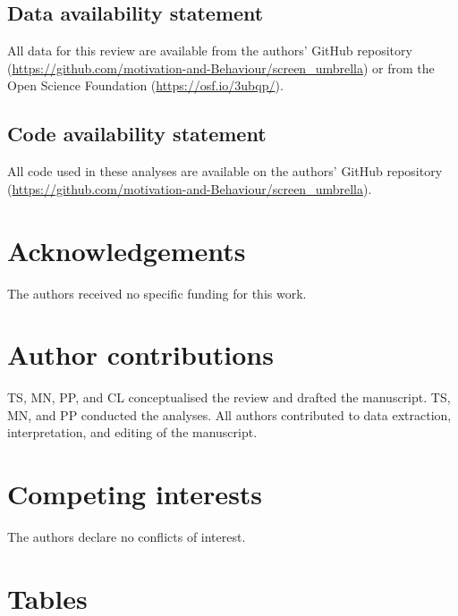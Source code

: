 \documentclass[
  english,
  man]{apa6}
\begin{document}
\hypertarget{data-availability-statement}{%
\subsection{Data availability statement}\label{data-availability-statement}}

All data for this review are available from the authors' GitHub repository (\url{https://github.com/motivation-and-Behaviour/screen_umbrella}) or from the Open Science Foundation (\url{https://osf.io/3ubqp/}).

\hypertarget{code-availability-statement}{%
\subsection{Code availability statement}\label{code-availability-statement}}

All code used in these analyses are available on the authors' GitHub repository (\url{https://github.com/motivation-and-Behaviour/screen_umbrella}).

\hypertarget{acknowledgements}{%
\section{Acknowledgements}\label{acknowledgements}}

The authors received no specific funding for this work.

\hypertarget{author-contributions}{%
\section{Author contributions}\label{author-contributions}}

TS, MN, PP, and CL conceptualised the review and drafted the manuscript.
TS, MN, and PP conducted the analyses.
All authors contributed to data extraction, interpretation, and editing of the manuscript.

\hypertarget{competing-interests}{%
\section{Competing interests}\label{competing-interests}}

The authors declare no conflicts of interest.

\hypertarget{tables}{%
\section{Tables}\label{tables}}
\end{document}
